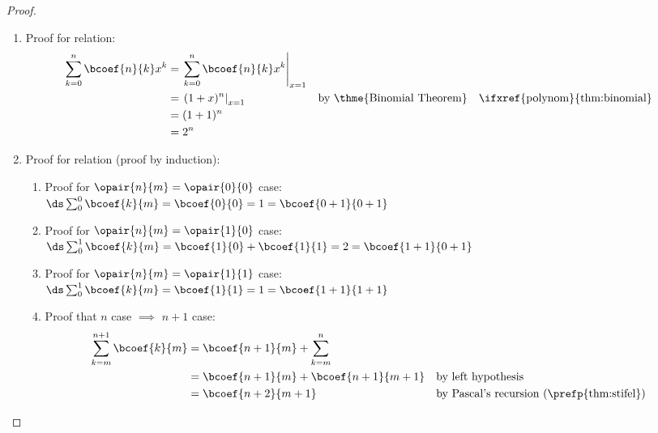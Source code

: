\begin{proof}
\begin{enumerate}
  \item Proof for  relation:
    \begin{align*}
      \sum_{k=0}^{n} \bcoef{n}{k} x^k
        &= \left. \sum_{k=0}^{n} \bcoef{n}{k} x^k \right|_{x=1}
      \\&= \left.(1+x)^{n} \right|_{x=1}
        && \text{by \thme{Binomial Theorem}} 
        && \text{\ifxref{polynom}{thm:binomial}}
      \\&= (1+1)^{n} 
      \\&= 2^{n} 
    \end{align*}
 
  \item Proof for  relation (proof by induction):
    \begin{enumerate}
      \item Proof for $\opair{n}{m}=\opair{0}{0}$ case:
        \\\indentx$\ds\sum_0^0\bcoef{k}{m} = \bcoef{0}{0} = 1 = \bcoef{0+1}{0+1}$
      \item Proof for $\opair{n}{m}=\opair{1}{0}$ case:
        \\\indentx$\ds\sum_0^1\bcoef{k}{m} = \bcoef{1}{0} + \bcoef{1}{1} = 2 = \bcoef{1+1}{0+1}$
      \item Proof for $\opair{n}{m}=\opair{1}{1}$ case:
        \\\indentx$\ds\sum_0^1\bcoef{k}{m} = \bcoef{1}{1} = 1 = \bcoef{1+1}{1+1}$
      \item Proof that $n$ case $\implies$ $n+1$ case:
        \begin{align*}
          \sum_{k=m}^{n+1} \bcoef{k}{m} 
            &= \bcoef{n+1}{m} + \sum_{k=m}^{n}
          \\&= \bcoef{n+1}{m} + \bcoef{n+1}{m+1}
            && \text{by left hypothesis}
          \\&= \bcoef{n+2}{m+1}
            && \text{by Pascal's recursion (\prefp{thm:stifel})}
        \end{align*}
    \end{enumerate}


\end{enumerate}
\end{proof}
